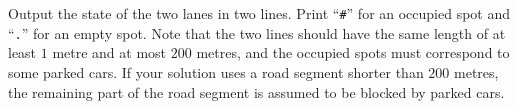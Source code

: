 
	Output the state of the two lanes in two lines.
	Print ``\texttt{\#}'' for an occupied spot and ``\texttt{.}'' for an empty spot.
	Note that the two lines should have the same length of at least $1$ metre and at most $200$ metres,
        and the occupied spots must correspond to some parked cars.
	If your solution uses a road segment shorter than $200$ metres,
        the remaining part of the road segment is assumed to be blocked by parked cars. 
